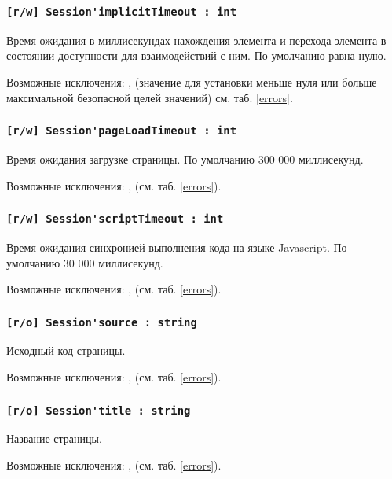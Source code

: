 \subsubsection{\lstinline|[r/w] Session'implicitTimeout : int|}

Время ожидания в миллисекундах нахождения элемента и перехода элемента в состоянии доступности для взаимодействий с ним. По умолчанию равна нулю.

Возможные исключения: ,  (значение для установки меньше нуля или больше максимальной безопасной целей значений) см. таб. \ref{errors}.

\subsubsection{\lstinline|[r/w] Session'pageLoadTimeout : int|}

Время ожидания загрузке страницы. По умолчанию 300 000 миллисекунд.

Возможные исключения: ,  (см. таб. \ref{errors}).

\subsubsection{\lstinline|[r/w] Session'scriptTimeout : int|}

Время ожидания синхронией выполнения кода на языке Javascript. По умолчанию 30 000 миллисекунд.

Возможные исключения: ,  (см. таб. \ref{errors}).

\subsubsection{\lstinline|[r/o] Session'source : string|}

Исходный код страницы.

Возможные исключения: ,  (см. таб. \ref{errors}).

\subsubsection{\lstinline|[r/o] Session'title : string|}

Название страницы.

Возможные исключения: ,  (см. таб. \ref{errors}).

